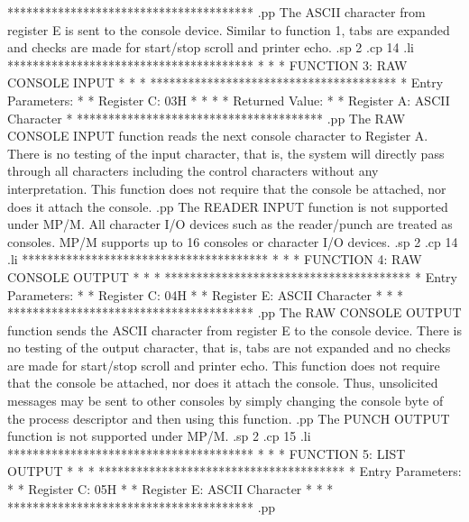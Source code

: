 ***************************************
.pp
The ASCII character from register E is sent to the console
device.  Similar to function 1, tabs are expanded and
checks are made for start/stop scroll and printer echo.
.sp 2
.cp 14
.li
***************************************
*                                     *
*  FUNCTION 3:  RAW CONSOLE INPUT     *
*                                     *
***************************************
*  Entry Parameters:                  *
*      Register   C:  03H             *
*                                     *
*  Returned   Value:                  *
*      Register   A:  ASCII Character *
***************************************
.pp
The RAW CONSOLE INPUT function reads the next console
character to Register A.  There is no testing of the input
character, that is, the system will directly pass through all
characters including the control characters without any
interpretation.   This function does not require that the console
be attached, nor does it attach the console.
.pp
The READER INPUT function is not supported under MP/M.  All
character I/O devices such as the reader/punch are treated as consoles.
MP/M supports up to 16 consoles or character I/O devices.
.sp 2
.cp 14
.li
***************************************
*                                     *
*  FUNCTION 4:  RAW CONSOLE OUTPUT    *
*                                     *
***************************************
*  Entry Parameters:                  *
*      Register   C:  04H             *
*      Register   E:  ASCII Character *
*                                     *
***************************************
.pp
The  RAW  CONSOLE OUTPUT function sends the  ASCII  character
from register E to the console device.  There is no testing of the
output character, that is, tabs are not expanded and no checks are
made  for start/stop scroll and printer echo.  This function  does
not  require that the console be attached, nor does it attach  the
console.  Thus, unsolicited messages may be sent to other consoles
by  simply changing the console byte of the process descriptor  and
then using this function.
.pp
The PUNCH OUTPUT function is not supported under MP/M.
.sp 2
.cp 15
.li
***************************************
*                                     *
*  FUNCTION 5:  LIST OUTPUT           *
*                                     *
***************************************
*  Entry Parameters:                  *
*      Register   C:  05H             *
*      Register   E:  ASCII Character *
*                                     *
***************************************
.pp
